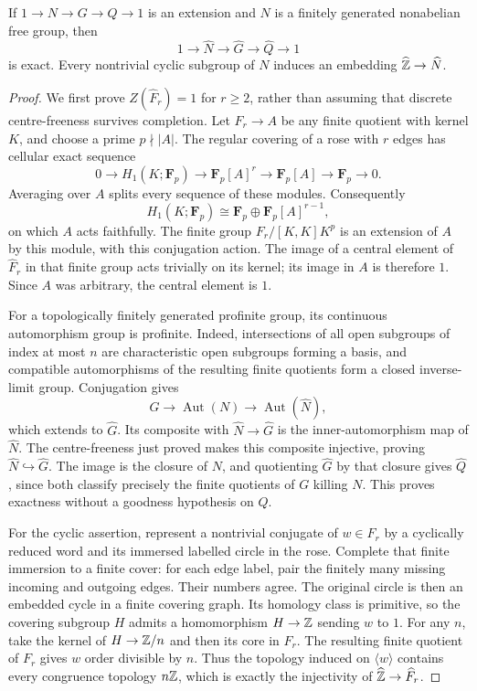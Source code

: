 \begin{lemma}\label{P3b-completion}
If $1\to N\to G\to Q\to1$ is an extension and $N$ is a finitely
generated nonabelian free group, then
\[
 1\longrightarrow\widehat N\longrightarrow\widehat G
 \longrightarrow\widehat Q\longrightarrow1
\]
is exact. Every nontrivial cyclic subgroup of $N$ induces an
embedding $\widehat{\mathbb Z}\to\widehat N$.
\end{lemma}
\begin{proof}
We first prove $Z(\widehat F_r)=1$ for $r\ge2$, rather than
assuming that discrete centre-freeness survives completion.
Let $F_r\to A$ be any finite quotient with kernel $K$, and choose
a prime $p\nmid |A|$. The regular covering of a rose with $r$
edges has cellular exact sequence
\[
 0\longrightarrow H_1(K;\mathbf F_p)
 \longrightarrow\mathbf F_p[A]^r
 \longrightarrow\mathbf F_p[A]
 \longrightarrow\mathbf F_p\longrightarrow0.
\]
Averaging over $A$ splits every sequence of these modules.
Consequently
\[
 H_1(K;\mathbf F_p)\cong
 \mathbf F_p\oplus\mathbf F_p[A]^{r-1},
\]
on which $A$ acts faithfully. The finite group
$F_r/[K,K]K^p$ is an extension of $A$ by this module, with this
conjugation action. The image of a central element of
$\widehat F_r$ in that finite group acts trivially on its kernel;
its image in $A$ is therefore $1$. Since $A$ was arbitrary,
the central element is $1$.

For a topologically finitely generated profinite group, its
continuous automorphism group is profinite. Indeed, intersections
of all open subgroups of index at most $n$ are characteristic
open subgroups forming a basis, and compatible automorphisms of
the resulting finite quotients form a closed inverse-limit group.
Conjugation gives
\[
 G\longrightarrow\operatorname{Aut}(N)
 \longrightarrow\operatorname{Aut}(\widehat N),
\]
which extends to $\widehat G$. Its composite with
$\widehat N\to\widehat G$ is the inner-automorphism map of
$\widehat N$. The centre-freeness just proved makes this
composite injective, proving $\widehat N\hookrightarrow\widehat G$.
The image is the closure of $N$, and quotienting $\widehat G$
by that closure gives $\widehat Q$, since both classify precisely
the finite quotients of $G$ killing $N$. This proves exactness
without a goodness hypothesis on $Q$.

For the cyclic assertion, represent a nontrivial conjugate of
$w\in F_r$ by a cyclically reduced word and its immersed labelled
circle in the rose. Complete that finite immersion to a finite
cover: for each edge label, pair the finitely many missing
incoming and outgoing edges. Their numbers agree. The original
circle is then an embedded cycle in a finite covering graph.
Its homology class is primitive, so the covering subgroup $H$
admits a homomorphism $H\to\mathbb Z$ sending $w$ to $1$.
For any $n$, take the kernel of $H\to\mathbb Z/n$ and then its core
in $F_r$. The resulting finite quotient of $F_r$ gives $w$
order divisible by $n$. Thus the topology induced on
$\langle w\rangle$ contains every congruence topology $n\mathbb Z$,
which is exactly the injectivity of
$\widehat{\mathbb Z}\to\widehat F_r$.
\end{proof}

